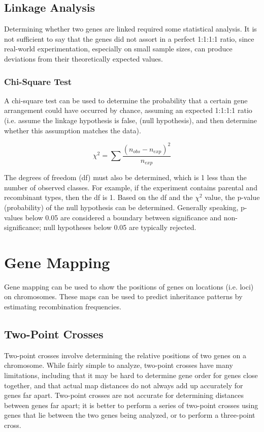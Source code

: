 \documentclass[12pt,titlepage]{article}
\begin{document}
      \subsection{Linkage Analysis}
        Determining whether two genes are linked required some statistical analysis. It is not sufficient to say that the genes did not assort in a perfect
        1:1:1:1 ratio, since real-world experimentation, especially on small sample sizes, can produce deviations from their theoretically expected values.

        \subsubsection{Chi-Square Test}
          A chi-square test can be used to determine the probability that a certain gene arrangement could have occurred by chance, assuming an expected
          1:1:1:1 ratio (i.e. assume the linkage hypothesis is false, (null hypothesis), and then determine whether this assumption matches the data).

          $$\chi^2 = \sum\frac{(n_{obs} - n_{exp})^2}{n_{exp}}$$

          The degrees of freedom (df) must also be determined, which is 1 less than the number of observed classes. For example, if the experiment contains
          parental and recombinant types, then the df is 1. Based on the df and the $\chi^2$ value, the p-value (probability) of the null hypothesis can be
          determined. Generally speaking, p-values below 0.05 are considered a boundary between significance and non-significance; null hypotheses below 0.05
          are typically rejected.

    \section{Gene Mapping}
      Gene mapping can be used to show the positions of genes on locations (i.e. loci) on chromosomes. These maps can be used to predict inheritance patterns
      by estimating recombination frequencies.

      \subsection{Two-Point Crosses}
        Two-point crosses involve determining the relative positions of two genes on a chromosome. While fairly simple to analyze, two-point crosses have many
        limitations, including that it may be hard to determine gene order for genes close together, and that actual map distances do not always add up accurately
        for genes far apart. Two-point crosses are not accurate for determining distances between genes far apart; it is better to perform a series of two-point
        crosses using genes that lie between the two genes being analyzed, or to perform a three-point cross.
\end{document}
